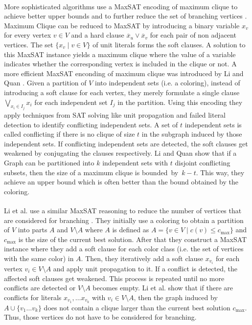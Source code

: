 \documentclass[]{article}
\begin{document}
\paragraph{}
More sophisticated algorithms use a MaxSAT encoding of maximum clique to achieve better upper bounds and to further reduce the set of branching vertices \cite{LiFangXu,LiJiang}. Maximum Clique can be reduced to MaxSAT by introducing a binary variable $x_v$ for every vertex $v\in V$ and a hard clause $\overline{x}_u\lor\overline{x}_v$ for each pair of non adjacent vertices. The set $\{x_v\;|\;v\in V\}$ of unit literals forms the soft clauses. A solution to this MaxSAT instance yields a maximum clique where the value of a variable indicates whether the corresponding vertex is included in the clique or not. A more efficient MaxSAT enconding of maximum clique was introduced by Li and Quan \cite{bibid}. Given a partition of $V$ into independent sets (i.e. a coloring), instead of introducing a soft clause for each vertex, they merely formulate a single clause $\bigvee_{x_i\in I_j} x_i$ for each independent set $I_j$ in the partition. Using this encoding they apply techniques from SAT solving like unit propagation and failed literal detection to identify conflicting independent sets. A set of $t$ independent sets is called conflicting if there is no clique of size $t$ in the subgraph induced by those independent sets. If conflicting independent sets are detected, the soft clauses get weakened by conjugating the clauses respectively. Li and Quan show that if a Graph can be partitioned into $k$ independent sets with $t$ disjoint conflicting subsets, then the size of a maximum clique is bounded~by~$k-t$. This way, they achieve an upper bound which is often better than the bound obtained by the coloring.
\paragraph{}
Li et al. use a similar MaxSAT reasoning to reduce the number of vertices that are considered for branching \cite{bibid}. They initially use a coloring to obtain a partition of $V$ into parts $A$ and $V\setminus A$ where $A$ is defined as $A = \{v\in V \;|\; c(v)\leq c_\text{max}\}$ and $c_\text{max}$ is the size of the current best solution. After that they construct a MaxSAT instance where they add a soft clause for each color class (i.e. the set of vertices with the same color) in $A$. Then, they iteratively add a soft clause $x_{v_i}$ for each vertex $v_i \in V\setminus A$ and apply unit propagation to it. If a conflict is detected, the affected soft clauses get weakened. This process is repeated until no more conflicts are detected or $V\setminus A$ becomes empty. Li et al. show that if there are conflicts for literals $x_{v_1},\dots x_{v_k}$ with $v_i\in V\setminus A$, then the graph induced by $A\cup\{v_1\dots v_k\}$ does not contain a clique larger than the current best solution $c_\text{max}$. Thus, those vertices do not have to be considered for branching.
\end{document}

